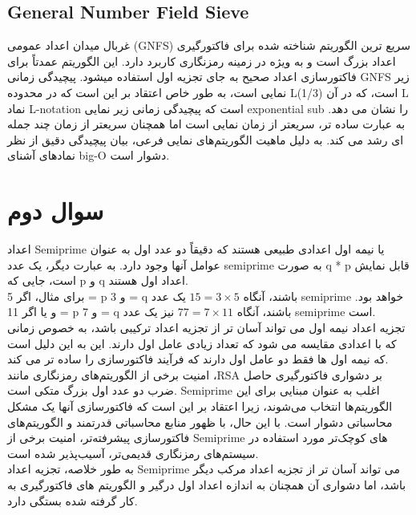 \subsection{General Number Field Sieve}
غربال میدان اعداد عمومی (GNFS)
سریع ترین الگوریتم شناخته شده برای فاکتورگیری اعداد بزرگ است و به ویژه در زمینه رمزنگاری کاربرد دارد.
  این الگوریتم عمدتاً برای فاکتورسازی اعداد صحیح به جای تجزیه اول استفاده میشود.  
پیچیدگی زمانی GNFS زیر نمایی است، به طور خاص اعتقاد بر این است که در محدوده L(1/3) است، که در آن L نماد L-notation است که پیچیدگی زمانی زیر نمایی  exponential sub را نشان می دهد. به عبارت ساده تر، سریعتر از زمان نمایی است اما همچنان سریعتر از زمان چند جمله ای رشد می کند. به دلیل ماهیت الگوریتم‌های نمایی فرعی، بیان پیچیدگی دقیق از نظر نمادهای آشنای big-O دشوار است.


\section{سوال دوم}
اعداد Semiprime یا نیمه ‌اول اعدادی طبیعی هستند که دقیقاً دو عدد اول به عنوان عوامل آنها وجود دارد. به عبارت دیگر، یک عدد semiprime به صورت q * p قابل نمایش است، جایی که p و q اعداد اول هستند.\\
برای مثال، اگر 5 = p و 3 = q باشند، آنگاه $15=3 \times 5$ یک عدد semiprime خواهد بود. و یا اگر 11 = p  و 7 = q باشند، آنگاه $77 = 7 \times 11$ نیز یک عدد semiprime است.\\
تجزیه اعداد نیمه اول می تواند آسان تر از تجزیه اعداد ترکیبی باشد، به خصوص زمانی که با اعدادی مقایسه می شود که تعداد زیادی عامل اول دارند. این به این دلیل است که نیمه اول ها فقط دو عامل اول دارند که فرآیند فاکتورسازی را ساده تر می کند.\\
امنیت برخی از الگوریتم‌های رمزنگاری مانند ،RSA بر دشواری فاکتورگیری حاصل ضرب دو عدد اول بزرگ متکی است. Semiprime اغلب به عنوان مبنایی برای این الگوریتم‌ها انتخاب می‌شوند، زیرا اعتقاد بر این است که فاکتورسازی آنها یک مشکل محاسباتی دشوار است. با این حال، با ظهور منابع محاسباتی قدرتمند و الگوریتم‌های فاکتورسازی پیشرفته‌تر، امنیت برخی از Semiprime ‌های کوچک‌تر مورد استفاده در سیستم‌های رمزنگاری قدیمی‌تر، آسیب‌پذیر شده است.\\
به طور خلاصه، تجزیه اعداد Semiprime می تواند آسان تر از تجزیه اعداد مرکب دیگر باشد، اما دشواری آن همچنان به اندازه اعداد اول درگیر و الگوریتم های فاکتورگیری به کار گرفته شده بستگی دارد.

